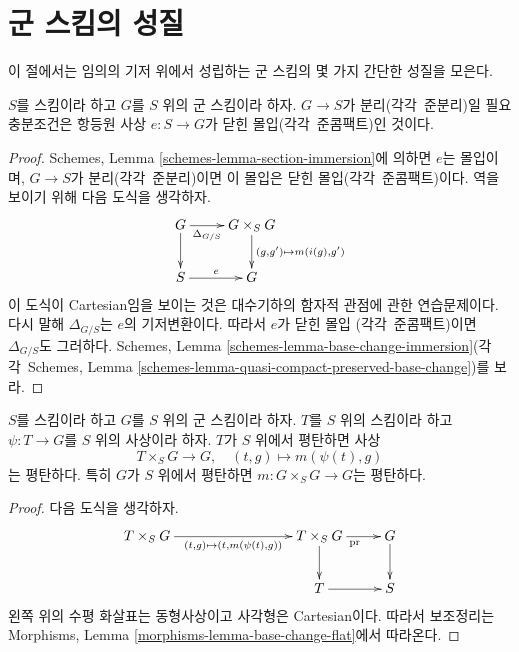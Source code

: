 \section{군 스킴의 성질}
\label{section-properties-group-schemes}

\noindent
이 절에서는 임의의 기저 위에서 성립하는 군 스킴의 몇 가지 간단한 성질을 모은다.

\begin{lemma}
\label{lemma-group-scheme-separated}
$S$를 스킴이라 하고 $G$를 $S$ 위의 군 스킴이라 하자.
$G \to S$가 분리(각각\ 준분리)일 필요충분조건은 항등원 사상 $e : S \to G$가
닫힌 몰입(각각\ 준콤팩트)인 것이다.
\end{lemma}

\begin{proof}
Schemes, Lemma \ref{schemes-lemma-section-immersion}에 의하면 $e$는 몰입이며,
$G \to S$가 분리(각각\ 준분리)이면 이 몰입은 닫힌 몰입(각각\ 준콤팩트)이다.
역을 보이기 위해 다음 도식을 생각하자.
$$
\xymatrix{
G \ar[r]_-{\Delta_{G/S}} \ar[d] &
G \times_S G \ar[d]^{(g, g') \mapsto m(i(g), g')} \\
S \ar[r]^e & G
}
$$
이 도식이 Cartesian임을 보이는 것은 대수기하의 함자적 관점에 관한 연습문제이다.
다시 말해 $\Delta_{G/S}$는 $e$의 기저변환이다. 따라서 $e$가 닫힌 몰입
(각각\ 준콤팩트)이면 $\Delta_{G/S}$도 그러하다. Schemes, Lemma
\ref{schemes-lemma-base-change-immersion}(각각\ Schemes, Lemma
\ref{schemes-lemma-quasi-compact-preserved-base-change})를 보라.
\end{proof}

\begin{lemma}
\label{lemma-flat-action-on-group-scheme}
$S$를 스킴이라 하고 $G$를 $S$ 위의 군 스킴이라 하자. $T$를 $S$ 위의 스킴이라 하고
$\psi : T \to G$를 $S$ 위의 사상이라 하자. $T$가 $S$ 위에서 평탄하면 사상
$$
T \times_S G \longrightarrow G, \quad
(t, g) \longmapsto m(\psi(t), g)
$$
는 평탄하다. 특히 $G$가 $S$ 위에서 평탄하면
$m : G \times_S G \to G$는 평탄하다.
\end{lemma}

\begin{proof}
다음 도식을 생각하자.
$$
\xymatrix{
T \times_S G \ar[rrr]_{(t, g) \mapsto (t, m(\psi(t), g))} & & &
T \times_S G \ar[r]_{\text{pr}} \ar[d] &
G \ar[d] \\
& & &
T \ar[r] &
S
}
$$
왼쪽 위의 수평 화살표는 동형사상이고 사각형은 Cartesian이다. 따라서 보조정리는
Morphisms, Lemma \ref{morphisms-lemma-base-change-flat}에서 따라온다.
\end{proof}

